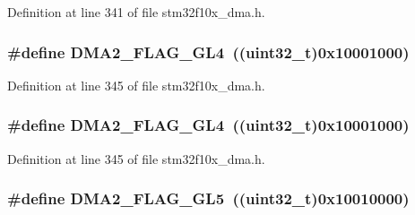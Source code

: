 Definition at line 341 of file stm32f10x\+\_\+dma.\+h.

\subsubsection[{\texorpdfstring{D\+M\+A2\+\_\+\+F\+L\+A\+G\+\_\+\+G\+L4}{DMA2_FLAG_GL4}}]{\setlength{\rightskip}{0pt plus 5cm}\#define D\+M\+A2\+\_\+\+F\+L\+A\+G\+\_\+\+G\+L4~(({\bf uint32\+\_\+t})0x10001000)}\hypertarget{group___d_m_a__flags__definition_ga624ff69707b76813a2170e4b1e0bda71}{}\label{group___d_m_a__flags__definition_ga624ff69707b76813a2170e4b1e0bda71}


Definition at line 345 of file stm32f10x\+\_\+dma.\+h.

\subsubsection[{\texorpdfstring{D\+M\+A2\+\_\+\+F\+L\+A\+G\+\_\+\+G\+L4}{DMA2_FLAG_GL4}}]{\setlength{\rightskip}{0pt plus 5cm}\#define D\+M\+A2\+\_\+\+F\+L\+A\+G\+\_\+\+G\+L4~(({\bf uint32\+\_\+t})0x10001000)}\hypertarget{group___d_m_a__flags__definition_ga624ff69707b76813a2170e4b1e0bda71}{}\label{group___d_m_a__flags__definition_ga624ff69707b76813a2170e4b1e0bda71}


Definition at line 345 of file stm32f10x\+\_\+dma.\+h.

\subsubsection[{\texorpdfstring{D\+M\+A2\+\_\+\+F\+L\+A\+G\+\_\+\+G\+L5}{DMA2_FLAG_GL5}}]{\setlength{\rightskip}{0pt plus 5cm}\#define D\+M\+A2\+\_\+\+F\+L\+A\+G\+\_\+\+G\+L5~(({\bf uint32\+\_\+t})0x10010000)}\hypertarget{group___d_m_a__flags__definition_gab0468b7a6e2fbdd5428da87252865623}{}\label{group___d_m_a__flags__definition_gab0468b7a6e2fbdd5428da87252865623}


